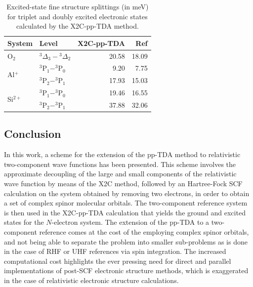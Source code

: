 \begin{table}[htbp]
 \caption{Excited-state fine structure splittings (in meV) for triplet
  and doubly excited electronic states calculated by the X2C-pp-TDA method.}
 \label{tb:DoubleEx}
 \centering
 \begin{tabular}{llrr}
  \hline
  System & Level & X2C-pp-TDA & Ref \cite{NIST_ASD,Krupenie72_423} \\ \hline
  O$_2$ & $^3\Delta_3-{^3\Delta_2}$ & 20.58 & 18.09 \\ \hline
  \multirow{2}{*}{Al$^+$} & $^3$P$_1-^3$P$_0$ & 9.20 & 7.75 \\ 
  & $^3$P$_2-^3$P$_1$ & 17.93 & 15.03 \\  \hline
  \multirow{2}{*}{Si$^{2+}$} & $^3$P$_1-^3$P$_0$ & 19.46 & 16.55 \\ 
  & $^3$P$_2-^3$P$_1$ & 37.88 & 32.06 \\    \hline
 \end{tabular}
\end{table}

\subsection{Conclusion}

In this work, a scheme for the extension of the pp-TDA method to relativistic
two-component wave functions has been presented.  This scheme involves the
approximate decoupling of the large and small components of the relativistic
wave function by means of the X2C method, followed by an Hartree-Fock SCF
calculation on the system obtained by removing two electrons, in order to
obtain a set of complex spinor molecular orbitals.  The two-component reference
system is then used in the X2C-pp-TDA calculation that yields the ground and
excited states for the $N$-electron system.  The extension of the pp-TDA to a
two-component reference comes at the cost of the employing complex spinor
orbitals, and not being able to separate the problem into smaller sub-problems
as is done in the case of RHF or UHF references via spin integration.  The
increased computational cost highlights the ever pressing need for direct and
parallel implementations of post-SCF electronic structure methods, which is
exaggerated in the case of relativistic electronic structure calculations.

